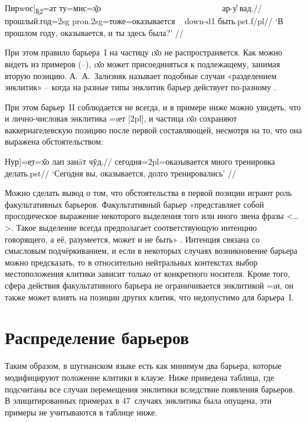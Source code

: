 \begingl
\gla {[}Пирwос{]}\textsubscript{\b{Б2}}=ат ту=мис=\b{х̌о} ~~~~~~~~~~~~~~~~~~~~~~~~~~~~ ар-у̊ вад.//
\glc прошлый.год={\sc 2sg} {\sc pron.2sg}=тоже=оказывается ~ {\sc down-d1} быть.{\sc pst.f/pl}//
\glft ‘В прошлом году, оказывается, и ты здесь была?’ //
\endgl \xe

При этом правило барьера~I на частицу \i{х̌о} не распространяется. Как можно видеть из примеров (–), \i{х̌о} может присоединяться к подлежащему, занимая вторую позицию. А.~А.~Зализняк называет подобные случаи «разделением энклитик» – когда на разные типы энклитик барьер действует по-разному \parencite[54]{zalizniak2008}.

При этом барьер~II соблюдается не всегда, и в примере ниже можно увидеть, что и лично-числовая энклитика =\i{ет} [{\sc 2pl}], и частица \i{х̌о} сохраняют ваккернагелевскую позицию после первой составляющей, несмотря на то, что она выражена обстоятельством:

\begingl
\gla {[}Нур{]}=\b{ет=х̌о} лап занāт чӯд.//
\glc сегодня={\sc 2pl}=оказывается много тренировка делать.{\sc pst}//
\glft ‘Сегодня вы, оказывается, долго тренировались’ //
\endgl \xe

Можно сделать вывод о том, что обстоятельства в первой позиции играют роль факультативных барьеров. Факультативный барьер «представляет собой просодическое выражение некоторого выделения того или иного звена фразы <…>. Такое выделение всегда предполагает соответствующую интенцию говорящего, а её, разумеется, может и не быть» \parencite[55]{zalizniak2008}. Интенция связана со смысловым подчёркиванием, и если в некоторых случаях возникновение барьера можно предсказать, то в относительно нейтральных контекстах выбор местоположения клитики зависит только от конкретного носителя. Кроме того, сфера действия факультативного барьера не ограничивается энклитикой =\i{и}, он также может влиять на позиции других клитик, что недопустимо для барьера~I.

\section{Распределение барьеров} \label{clit-distrib}

Таким образом, в шугнанском языке есть как минимум два барьера, которые модифицируют положение клитики в клаузе. Ниже приведена таблица, где подсчитаны все случаи перемещения энклитики вследствие появления барьеров. В элицитированных примерах в 47~случаях энклитика была опущена, эти примеры не учитываются в таблице ниже.

